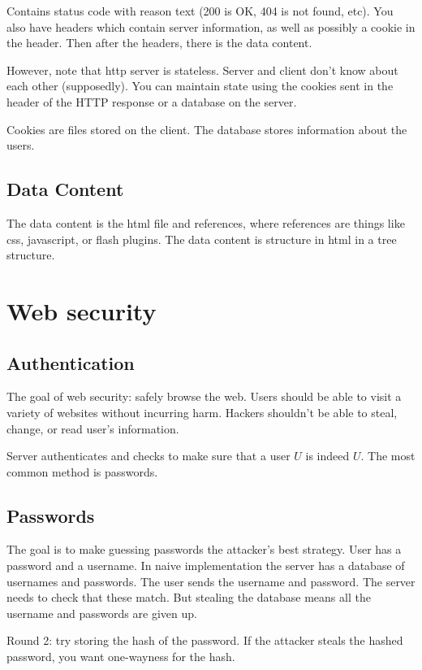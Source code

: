 \documentclass[psamsfonts]{amsart}
\begin{document}
Contains status code with reason text (200 is OK, 404 is not found, etc). You also have headers which contain server information, as well as possibly a cookie in the header. Then after the headers, there is the data content.

However, note that http server is stateless. Server and client don't know about each other (supposedly). You can maintain state using the cookies sent in the header of the HTTP response or a database on the server.

Cookies are files stored on the client. The database stores information about the users.

\subsection{Data Content}

The data content is the html file and references, where references are things like css, javascript, or flash plugins. The data content is structure in html in a tree structure. 

\section{Web security}

\subsection{Authentication}

The goal of web security: safely browse the web. Users should be able to visit a variety of websites without incurring harm. Hackers shouldn't be able to steal, change, or read user's information.

Server authenticates and checks to make sure that a user $U$ is indeed $U$. The most common method is passwords.

\subsection{Passwords}

The goal is to make guessing passwords the attacker's best strategy. User has a password and a username. In naive implementation the server has a database of usernames and passwords. The user sends the username and password. The server needs to check that these match. But stealing the database means all the username and passwords are given up.

Round 2: try storing the hash of the password. If the attacker steals the hashed password, you want one-wayness for the hash.
\end{document}
